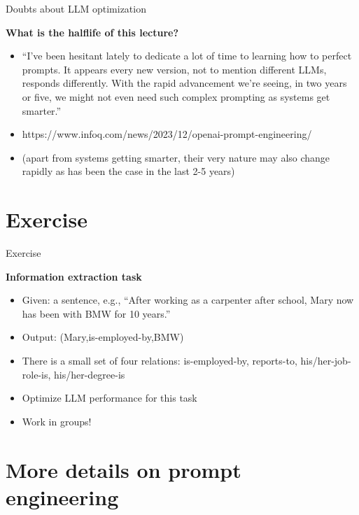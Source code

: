 \begin{vbframe}{Doubts about LLM optimization}

\vfill

\textbf{What is the halflife of this lecture?}

	\begin{itemize}
		\item ``I've been hesitant lately to dedicate a lot of time to
learning how to perfect prompts. It appears every new
version, not to mention different LLMs, responds
differently. With the rapid advancement we're seeing, in two
years or five, we might not even need such complex prompting
as systems get smarter.''
\item https://www.infoq.com/news/2023/12/openai-prompt-engineering/
\item (apart from systems getting smarter, their very nature
may also change rapidly as has been the case in the last 2-5
		years)
	\end{itemize}

\vfill

\end{vbframe}



\section{Exercise}

\begin{vbframe}{Exercise}

\vfill

\textbf{Information extraction task}

\begin{itemize}
                \item Given: a sentence, e.g., ``After
                working as a carpenter after school, Mary now has
                been with BMW for 10 years.''
\item Output: (Mary,is-employed-by,BMW)
\item There is a small set of four relations: is-employed-by,
                reports-to,
                his/her-job-role-is, his/her-degree-is
\item Optimize LLM performance for this task
\item Work in groups!

\end{itemize}

\vfill

\end{vbframe}




\section{More details on prompt engineering}

\begin{vbframe}{}

\vfill


\href{https://platform.openai.com/docs/guides/prompt-engineering}{}



\vfill

\end{vbframe}


\endlecture

